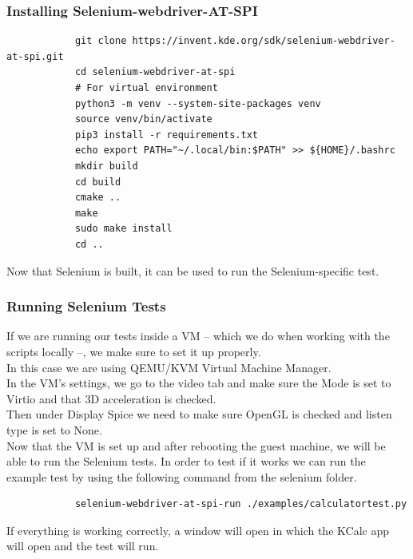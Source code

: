 \documentclass{article}
\begin{document}
        \subsubsection{Installing Selenium-webdriver-AT-SPI}
        \begin{lstlisting}
            git clone https://invent.kde.org/sdk/selenium-webdriver-at-spi.git
            cd selenium-webdriver-at-spi
            # For virtual environment
            python3 -m venv --system-site-packages venv
            source venv/bin/activate
            pip3 install -r requirements.txt
            echo export PATH="~/.local/bin:$PATH" >> ${HOME}/.bashrc
            mkdir build
            cd build
            cmake ..
            make
            sudo make install
            cd ..
        \end{lstlisting}
        Now that Selenium is built, it can be used to run the Selenium-specific test.

        \subsubsection{Running Selenium Tests}
        If we are running our tests inside a VM -- which we do when working 
        with the scripts locally --, we make sure to set it up properly.\\
        In this case we are using QEMU/KVM Virtual Machine Manager.\\

        In the VM's settings, we go to the video tab and make sure 
        the Mode is set to Virtio and that 3D acceleration is checked.\\
        Then under Display Spice we need to make sure OpenGL is checked and 
        listen type is set to None.\\

        Now that the VM is set up and after rebooting the guest machine, we 
        will be able to run the Selenium tests.
        In order to test if it works we can run the example test by using the 
        following command from the selenium folder.

        \begin{lstlisting}
            selenium-webdriver-at-spi-run ./examples/calculatortest.py
        \end{lstlisting}
        If everything is working correctly, a window will open in which the 
        KCalc app will open and the test will run.
\end{document}
